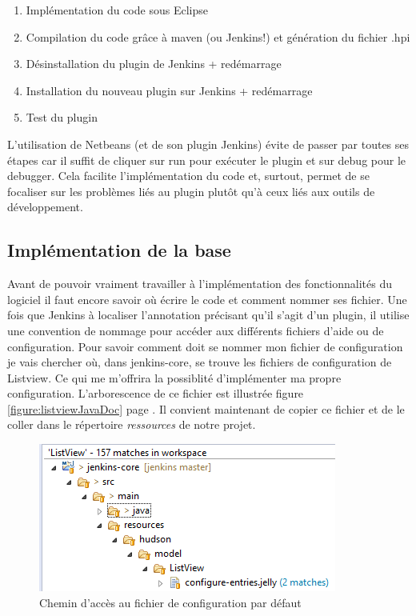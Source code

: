 \begin{enumerate}
	\item Implémentation du code sous Eclipse
	\item Compilation du code grâce à maven (ou Jenkins!) et génération du fichier .hpi
	\item Désinstallation du plugin de Jenkins + redémarrage
	\item Installation du nouveau plugin sur Jenkins + redémarrage
	\item Test du plugin
\end{enumerate}
L'utilisation de Netbeans (et de son plugin Jenkins) évite de passer par toutes ses étapes car il suffit de cliquer sur run pour exécuter le plugin et sur debug pour le debugger. Cela facilite l'implémentation du code et, surtout, permet de se focaliser sur les problèmes liés au plugin plutôt qu'à ceux liés aux outils de développement.\\


\subsection{Implémentation de la base}

Avant de pouvoir vraiment travailler à l'implémentation des fonctionnalités du logiciel il faut encore savoir où écrire le code et comment nommer ses fichier. Une fois que Jenkins à localiser l'annotation précisant qu'il s'agit d'un plugin, il utilise une convention de nommage pour accéder aux différents fichiers d'aide ou de configuration. Pour savoir comment doit se nommer mon fichier de configuration je vais chercher où, dans jenkins-core, se trouve les fichiers de configuration de Listview. Ce qui me m'offrira la possiblité d'implémenter ma propre configuration. L'arborescence de ce fichier est illustrée figure \ref{figure:listviewJavaDoc} page \pageref{figure:listviewJavaDoc}. Il convient maintenant de copier ce fichier et de le coller dans le répertoire \emph{ressources} de notre projet.


\begin{figure}[!h]
  \centering
      \includegraphics{images/listviewSearch.png}
  \caption{Chemin d'accès au fichier de configuration par défaut}
	\label{figure:listviewSearch}
\end{figure}

